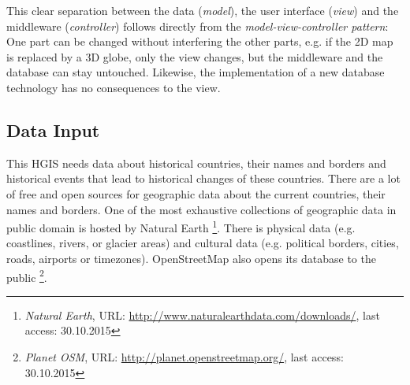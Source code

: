 This clear separation between the data (\emph{model}), the user interface (\emph{view}) and the middleware (\emph{controller}) follows directly from the \emph{model-view-controller pattern}: One part can be changed without interfering the other parts, e.g. if the 2D map is replaced by a 3D globe, only the view changes, but the middleware and the database can stay untouched. Likewise, the implementation of a new database technology has no consequences to the view.



\subsection{Data Input} %
\label{sub:input}

This HGIS needs data about historical countries, their names and borders and historical events that lead to historical changes of these countries. There are a lot of free and open sources for geographic data about the current countries, their names and borders. One of the most exhaustive collections of geographic data in public domain is hosted by Natural Earth
\footnote{
  \textit{Natural Earth},
  URL: \url{http://www.naturalearthdata.com/downloads/},
  last access: 30.10.2015
}.
There is physical data (e.g. coastlines, rivers, or glacier areas) and cultural data (e.g. political borders, cities, roads, airports or timezones). OpenStreetMap also opens its database to the public
\footnote{
  \textit{Planet OSM},
  URL: \url{http://planet.openstreetmap.org/},
  last access: 30.10.2015
}.

